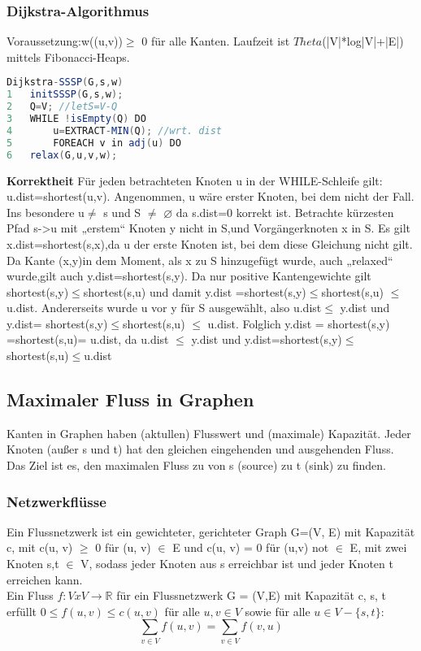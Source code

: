 \documentclass[jou,apacite]{apa6}
\begin{document}
\subsubsection{Dijkstra-Algorithmus} Voraussetzung:w((u,v))$\geq$ 0 für alle Kanten. Laufzeit ist $Theta$(|V|*log|V|+|E|) mittels Fibonacci-Heaps.
\begin{lstlisting}[language =java]
Dijkstra-SSSP(G,s,w)
1   initSSSP(G,s,w);
2   Q=V; //letS=V-Q
3   WHILE !isEmpty(Q) DO
4       u=EXTRACT-MIN(Q); //wrt. dist
5       FOREACH v in adj(u) DO
6   relax(G,u,v,w);
\end{lstlisting}
{\bfseries Korrektheit } Für jeden betrachteten Knoten u in der WHILE-Schleife gilt: u.dist=shortest(u,v). Angenommen, u wäre erster Knoten, bei dem nicht der Fall. Ins besondere u$\neq$ s und S $\neq$ $\varnothing$ da s.dist=0 korrekt ist. Betrachte kürzesten Pfad s->u mit „erstem“ Knoten y nicht in S,und Vorgängerknoten x in S. Es gilt x.dist=shortest(s,x),da u der erste Knoten ist, bei dem diese Gleichung nicht gilt. Da Kante (x,y)in dem Moment, als x zu S hinzugefügt wurde, auch „relaxed“ wurde,gilt auch  y.dist=shortest(s,y). Da nur positive Kantengewichte gilt shortest(s,y)$ \leq$shortest(s,u) und damit y.dist =shortest(s,y)$ \leq$shortest(s,u) $ \leq$u.dist. Andererseits wurde u vor y für S ausgewählt, also u.dist$\leq$ y.dist und y.dist= shortest(s,y)$\leq$shortest(s,u) $\leq$ u.dist. Folglich y.dist = shortest(s,y) =shortest(s,u)= u.dist, da u.dist $\leq$ y.dist und y.dist=shortest(s,y)$\leq$shortest(s,u)$\leq$u.dist

\subsection{Maximaler Fluss in Graphen}
Kanten in Graphen haben (aktullen) Flusswert und (maximale) Kapazität. Jeder Knoten (außer s und t) hat den gleichen eingehenden und ausgehenden Fluss. Das Ziel ist es, den maximalen Fluss zu von s (source) zu t (sink) zu finden. 


\subsubsection{Netzwerkflüsse}
Ein Flussnetzwerk ist ein gewichteter, gerichteter Graph G=(V, E) mit Kapazität c, mit c(u, v) $\ge$ 0 für (u, v) $\in$ E und c(u, v) = 0 für (u,v) not $\in$ E, mit zwei Knoten s,t $\in$ V, sodass jeder Knoten aus s erreichbar ist und jeder Knoten t erreichen kann. \\
Ein Fluss $f: V x V \rightarrow \mathbb{R}$ für ein Flussnetzwerk G = (V,E) mit Kapazität c, s, t erfüllt $0\le f(u,v) \le c(u,v)$ für alle $u,v\in V$ sowie für alle $u \in V - \{s,t\}$:
$$\sum\limits_{v\in V} f(u, v) = \sum\limits_{v\in V} f(v, u)$$
\end{document}
